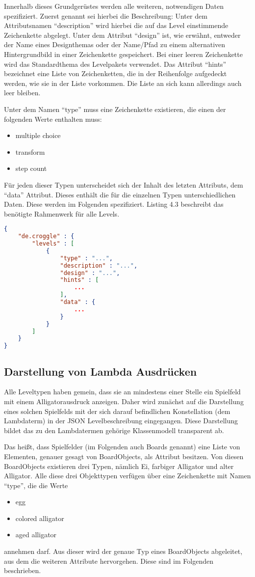 Innerhalb dieses Grundgerüstes werden alle weiteren, notwendigen Daten spezifiziert.
Zuerst genannt sei hierbei die Beschreibung: Unter dem Attributsnamen "`description"' wird hierbei die auf das Level einstimmende Zeichenkette abgelegt.
Unter dem Attribut "`design"' ist, wie erwähnt, entweder der Name eines Designthemas oder der Name/Pfad zu einem alternativen Hintergrundbild in einer Zeichenkette gespeichert.
Bei einer leeren Zeichenkette wird das Standardthema des Levelpakets verwendet.
Das Attribut "`hints"' bezeichnet eine Liste von Zeichenketten, die in der Reihenfolge aufgedeckt werden, wie sie in der Liste vorkommen.
Die Liste an sich kann allerdings auch leer bleiben.

Unter dem Namen "`type"' muss eine Zeichenkette existieren, die einen der folgenden Werte enthalten muss:
\begin{itemize}
	\item multiple choice
	\item transform
	\item step count
\end{itemize}

Für jeden dieser Typen unterscheidet sich der Inhalt des letzten Attributs, dem "`data"' Attribut.
Dieses enthält die für die einzelnen Typen unterschiedlichen Daten.
Diese werden im Folgenden spezifiziert.
Listing 4.3 beschreibt das benötigte Rahmenwerk für alle Levels.
\begin{lstlisting}[language=json,caption={JSON Leveldatei, z.B. json/00/00.json}]
{
	"de.croggle" : {
		"levels" : [
			{
				"type" : "...",
				"description" : "...",
				"design" : "...",
				"hints" : [
					...
				],
				"data" : {
					...
				}
			}
		]
	}
}
\end{lstlisting}

\subsection{Darstellung von Lambda Ausdrücken}
Alle Leveltypen haben gemein, dass sie an mindestens einer Stelle ein Spielfeld mit einem Alligatorausdruck anzeigen.
Daher wird zunächst auf die Darstellung eines solchen Spielfelds mit der sich darauf befindlichen Konstellation (dem Lambdaterm) in der JSON Levelbeschreibung eingegangen.
Diese Darstellung bildet das zu den Lambdatermen gehörige Klassenmodell transparent ab.


Das heißt, dass Spielfelder (im Folgenden auch Boards genannt) eine Liste von Elementen, genauer gesagt von BoardObjects, als Attribut besitzen.
Von diesen BoardObjects existieren drei Typen, nämlich Ei, farbiger Alligator und alter Alligator.
Alle diese drei Objekttypen verfügen über eine Zeichenkette mit Namen "`type"', die die Werte
\begin{itemize}
	\item egg
	\item colored alligator
	\item aged alligator
\end{itemize}
annehmen darf.
Aus dieser wird der genaue Typ eines BoardObjects abgeleitet, aus dem die weiteren Attribute hervorgehen.
Diese sind im Folgenden beschrieben.

